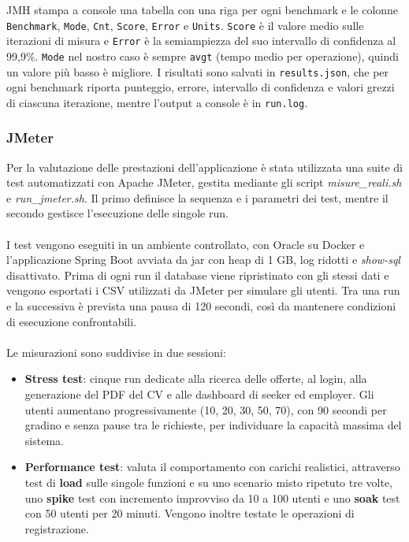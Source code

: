 \documentclass[12pt,a4paper]{article}
\begin{document}
    JMH stampa a console una tabella con una riga per ogni benchmark e le
    colonne \texttt{Benchmark}, \texttt{Mode}, \texttt{Cnt}, \texttt{Score},
    \texttt{Error} e \texttt{Units}. \texttt{Score} è il valore medio sulle
    iterazioni di misura e \texttt{Error} è la semiampiezza del suo intervallo
    di confidenza al 99,9\%. \texttt{Mode} nel nostro caso è sempre \texttt{avgt}
    (tempo medio per operazione), quindi un valore più basso è migliore.
    I risultati sono salvati in \texttt{results.json}, che per ogni
    benchmark riporta punteggio, errore, intervallo di confidenza e valori grezzi
    di ciascuna iterazione, mentre l'output a console è in \texttt{run.log}.

    \subsubsection{JMeter}
    Per la valutazione delle prestazioni dell'applicazione è stata utilizzata una suite
    di test automatizzati con Apache JMeter, gestita mediante gli script
    \textit{misure\_reali.sh} e \textit{run\_jmeter.sh}. Il primo definisce la sequenza
    e i parametri dei test, mentre il secondo gestisce l'esecuzione delle singole run. \\ \\
    I test vengono eseguiti in un ambiente controllato, con Oracle su Docker e
    l'applicazione Spring Boot avviata da jar con heap di 1 GB, log ridotti e
    \textit{show-sql} disattivato. Prima di ogni run il database viene ripristinato
    con gli stessi dati e vengono esportati i CSV utilizzati da JMeter per simulare
    gli utenti. Tra una run e la successiva è prevista una pausa di 120 secondi,
    così da mantenere condizioni di esecuzione confrontabili. \\ \\
    Le misurazioni sono suddivise in due sessioni:
    \begin{itemize}
        \item \textbf{Stress test}: cinque run dedicate alla ricerca delle offerte,
        al login, alla generazione del PDF del CV e alle dashboard di seeker ed
        employer. Gli utenti aumentano progressivamente (10, 20, 30, 50, 70),
        con 90 secondi per gradino e senza pause tra le richieste, per individuare
        la capacità massima del sistema.
        \item \textbf{Performance test}: valuta il comportamento con carichi realistici,
        attraverso test di \textbf{load} sulle singole funzioni e su uno scenario misto
        ripetuto tre volte, uno \textbf{spike} test con incremento improvviso da 10 a 100
        utenti e uno \textbf{soak} test con 50 utenti per 20 minuti. Vengono inoltre
        testate le operazioni di registrazione.
    \end{itemize}
\end{document}
